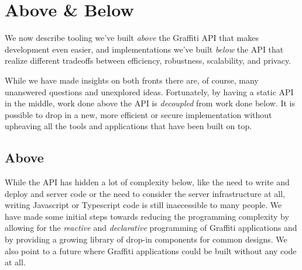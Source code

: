 \section{Above & Below}

We now describe tooling we've built \emph{above}
the Graffiti API that makes development even easier, and
implementations we've built \emph{below} the API
that realize different tradeoffs between efficiency,
robustness, scalability, and privacy.

While we have made insights on both fronts there are, of course,
many unanswered questions and unexplored ideas.
Fortunately, by having a static API in the middle, work done above the API
is \emph{decoupled} from work done below.
It is possible to drop in a new, more efficient or secure implementation
without upheaving all the tools and applications that have been built on top.


\subsection{Above}

While the API has hidden a lot of complexity below,
like the need to write and deploy and server code or the need to
consider the server infrastructure at all,
writing Javascript or Typescript code is still inaccessible
to many people.
We have made some initial steps towards reducing the
programming complexity by allowing for the \emph{reactive} and
\emph{declarative} programming of Graffiti applications
and by providing a growing library of drop-in components for common designs.
We also point to a future where Graffiti applications could be built
without any code at all.

